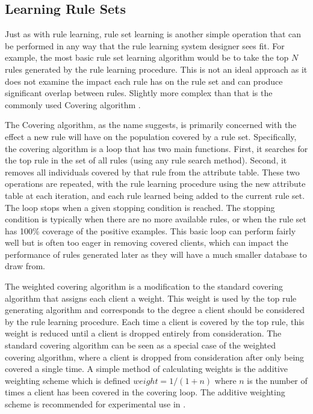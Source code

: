 

\subsection{Learning Rule Sets} \label{chap:rule:sets}
Just as with rule learning, rule set learning is another simple operation that can be performed in any way that the rule learning system designer sees fit. For example, the most basic rule set learning algorithm would be to take the top $N$ rules generated by the rule learning procedure. This is not an ideal approach as it does not examine the impact each rule has on the rule set and can produce significant overlap between rules. Slightly more complex than that is the commonly used Covering algorithm \cite{michalski1969covering}.

The Covering algorithm, as the name suggests, is primarily concerned with the effect a new rule will have on the population covered by a rule set. Specifically, the covering algorithm is a loop that has two main functions. First, it searches for the top rule in the set of all rules (using any rule search method). Second, it removes all individuals covered by that rule from the attribute table. These two operations are repeated, with the rule learning procedure using the new attribute table at each iteration, and each rule learned being added to the current rule set. The loop stops when a given stopping condition is reached.
The stopping condition is typically when there are no more available rules, or when the rule set has 100\% coverage of the positive examples. This basic loop can perform fairly well but is often too eager in removing covered clients, which can impact the performance of rules generated later as they will have a much smaller database to draw from.

The weighted covering algorithm \cite{lavrac2004weighted} is a modification to the standard covering algorithm that assigns each client a weight. This weight is used by the top rule generating algorithm and corresponds to the degree a client should be considered by the rule learning procedure. Each time a client is covered by the top rule, this weight is reduced until a client is dropped entirely from consideration. The standard covering algorithm can be seen as a special case of the weighted covering algorithm, where a client is dropped from consideration after only being covered a single time. A simple method of calculating weights is the additive weighting scheme \cite{lavrac2004weighted} which is defined $weight = 1/(1+n)$ where $n$ is the number of times a client has been covered in the covering loop. The additive weighting scheme is recommended for experimental use in \cite{lavrac2004weighted}.

